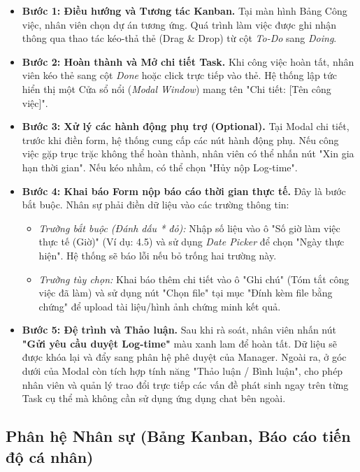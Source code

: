 \documentclass[a4paper,13.5pt]{extreport}
\begin{document}
\begin{itemize}
    \item \textbf{Bước 1: Điều hướng và Tương tác Kanban.} Tại màn hình Bảng Công việc, nhân viên chọn dự án tương ứng. Quá trình làm việc được ghi nhận thông qua thao tác kéo-thả thẻ (Drag \& Drop) từ cột \textit{To-Do} sang \textit{Doing}.
    
    \item \textbf{Bước 2: Hoàn thành và Mở chi tiết Task.} Khi công việc hoàn tất, nhân viên kéo thẻ sang cột \textit{Done} hoặc click trực tiếp vào thẻ. Hệ thống lập tức hiển thị một Cửa sổ nổi (\textit{Modal Window}) mang tên "Chi tiết: [Tên công việc]".
    
    \item \textbf{Bước 3: Xử lý các hành động phụ trợ (Optional).} Tại Modal chi tiết, trước khi điền form, hệ thống cung cấp các nút hành động phụ. Nếu công việc gặp trục trặc không thể hoàn thành, nhân viên có thể nhấn nút "Xin gia hạn thời gian". Nếu kéo nhầm, có thể chọn "Hủy nộp Log-time".
    
    \item \textbf{Bước 4: Khai báo Form nộp báo cáo thời gian thực tế.} Đây là bước bắt buộc. Nhân sự phải điền dữ liệu vào các trường thông tin:
        \begin{itemize}
            \item \textit{Trường bắt buộc (Đánh dấu * đỏ):} Nhập số liệu vào ô "Số giờ làm việc thực tế (Giờ)" (Ví dụ: 4.5) và sử dụng \textit{Date Picker} để chọn "Ngày thực hiện". Hệ thống sẽ báo lỗi nếu bỏ trống hai trường này.
            \item \textit{Trường tùy chọn:} Khai báo thêm chi tiết vào ô "Ghi chú" (Tóm tắt công việc đã làm) và sử dụng nút "Chọn file" tại mục "Đính kèm file bằng chứng" để upload tài liệu/hình ảnh chứng minh kết quả.
        \end{itemize}
    
    \item \textbf{Bước 5: Đệ trình và Thảo luận.} Sau khi rà soát, nhân viên nhấn nút \textbf{"Gửi yêu cầu duyệt Log-time"} màu xanh lam để hoàn tất. Dữ liệu sẽ được khóa lại và đẩy sang phân hệ phê duyệt của Manager. Ngoài ra, ở góc dưới của Modal còn tích hợp tính năng "Thảo luận / Bình luận", cho phép nhân viên và quản lý trao đổi trực tiếp các vấn đề phát sinh ngay trên từng Task cụ thể mà không cần sử dụng ứng dụng chat bên ngoài.
\end{itemize}
\subsection{Phân hệ Nhân sự (Bảng Kanban, Báo cáo tiến độ cá nhân)}
\end{document}
